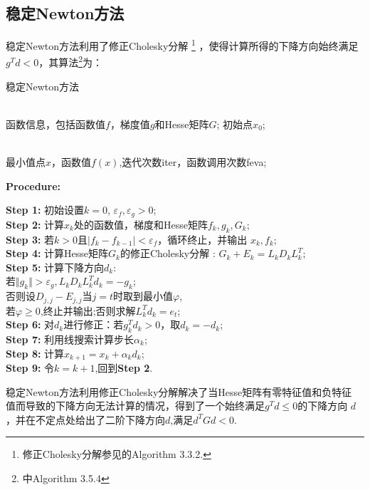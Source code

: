 \documentclass[a4paper,  11pt]{ctexart}
\begin{document}
\subsection{稳定Newton方法}
稳定Newton方法利用了修正Cholesky分解
\footnote{修正Cholesky分解参见\cite{article1}的Algorithm 3.3.2.}
，使得计算所得的下降方向始终满足
$g^Td<0$，其算法\footnote{\cite{article1}中Algorithm 3.5.4}为：
\begin{algorithm}[H]
\caption{稳定Newton方法}
\begin{algorithmic}[2]
\REQUIRE ~~\\
函数信息，包括函数值$f$，梯度值$g$和Hesse矩阵$G$; \quad 初始点$x_0$;

\ENSURE ~~\\
最小值点$x$，函数值$f(x)$,迭代次数iter，函数调用次数feva;

\hspace{-0.65cm}\textbf{Procedure:}

\textbf{Step 1:}  初始设置$k = 0$, $\varepsilon_f,\varepsilon_g>0$; \\
\textbf{Step 2:}  计算$x_k$处的函数值，梯度和Hesse矩阵$f_k,g_k,G_k$; \\
\textbf{Step 3:}  若$k>0$且$|f_{k}-f_{k-1}|<\varepsilon_f$，循环终止，并输出
$x_k,f_k$;\\
\textbf{Step 4:}  计算Hesse矩阵$G_k$的修正Cholesky分解
:
$G_k+E_k=L_kD_kL^T_k$;\\
\textbf{Step 5:}  计算下降方向$d_k$:\\
\hspace{1.52cm}若$\Vert g_k\Vert>\varepsilon_g,
L_kD_kL^T_kd_k=-g_k$;\\
\hspace{1.52cm}
否则设$D_{j,j}-E_{j,j}$当$j=t$时取到最小值$\varphi$,\\
\hspace{1.52cm}
若$\varphi\geq0$,终止并输出;否则求解$L^T_kd_k=e_t$;\\

\textbf{Step 6:}  对$d_k$进行修正：若$g_k^Td_k>0$，取$d_k=-d_k$;\\
\textbf{Step 7:}  利用线搜索计算步长$\alpha_k$;\\
\textbf{Step 8:}  计算$x_{k+1}=x_k+\alpha_kd_k$; \\
\textbf{Step 9:}  令$k=k+1$,回到\textbf{Step 2}.
\end{algorithmic}
\end{algorithm}
稳定Newton方法利用修正Cholesky分解解决了当Hesse矩阵有零特征值和负特征
值而导致的下降方向无法计算的情况，得到了一个始终满足$g^Td\leq0$的下降方向
$d$，并在不定点处给出了二阶下降方向$d$,满足$d^TGd<0$.
\end{document}
